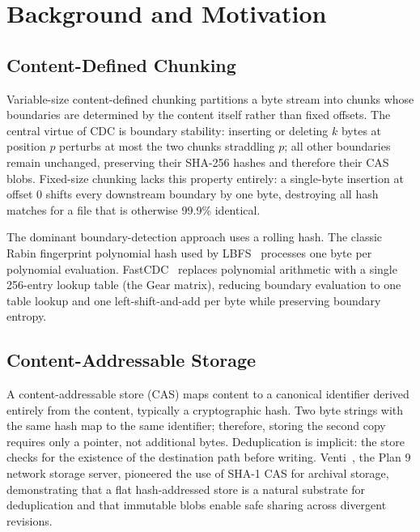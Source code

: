 \documentclass[5p,times]{elsarticle}
\begin{document}
\section{Background and Motivation}

\subsection{Content-Defined Chunking}

Variable-size content-defined chunking partitions a byte stream into
chunks whose boundaries are determined by the content itself rather than
fixed offsets.  The central virtue of CDC is boundary stability: inserting
or deleting $k$ bytes at position $p$ perturbs at most the two chunks
straddling $p$; all other boundaries remain unchanged, preserving their
SHA-256 hashes and therefore their CAS blobs.  Fixed-size chunking lacks
this property entirely: a single-byte insertion at offset 0 shifts every
downstream boundary by one byte, destroying all hash matches for a file
that is otherwise 99.9\% identical.

The dominant boundary-detection approach uses a rolling hash.  The classic
Rabin fingerprint polynomial hash used by LBFS~\cite{muthitacharoen2001lbfs}
processes one byte per polynomial evaluation.  FastCDC~\cite{xia2016fastcdc}
replaces polynomial arithmetic with a single 256-entry lookup table (the
Gear matrix), reducing boundary evaluation to one table lookup and one
left-shift-and-add per byte while preserving boundary entropy.

\subsection{Content-Addressable Storage}

A content-addressable store (CAS) maps content to a canonical identifier
derived entirely from the content, typically a cryptographic hash.  Two
byte strings with the same hash map to the same identifier; therefore,
storing the second copy requires only a pointer, not additional bytes.
Deduplication is implicit: the store checks for the existence of the
destination path before writing.  Venti~\cite{quinlan2002venti}, the Plan
9 network storage server, pioneered the use of SHA-1 CAS for archival
storage, demonstrating that a flat hash-addressed store is a natural
substrate for deduplication and that immutable blobs enable safe sharing
across divergent revisions.
\end{document}
